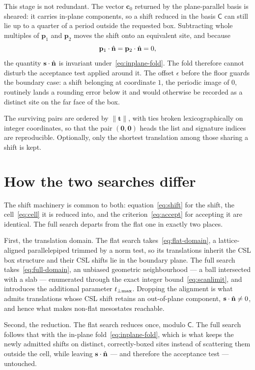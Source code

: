 This stage is not redundant. The vector $\mathbf{c}_0$ returned by the
plane-parallel basis is sheared: it carries in-plane components, so a shift
reduced in the basis $\mathsf{C}$ can still lie up to a quarter of a period
outside the requested box. Subtracting whole multiples of $\mathbf{p}_1$ and
$\mathbf{p}_2$ moves the shift onto an equivalent site, and because
\begin{equation}
  \mathbf{p}_1 \cdot \hat{\mathbf{n}} = \mathbf{p}_2 \cdot \hat{\mathbf{n}} = 0 ,
  \label{eq:inplane-orthogonal}
\end{equation}
the quantity $\mathbf{s} \cdot \hat{\mathbf{n}}$ is invariant under~\eqref{eq:inplane-fold}.
The fold therefore cannot disturb the acceptance test applied around it. The
offset $\epsilon$ before the floor guards the boundary case: a shift belonging at
coordinate $1$, the periodic image of $0$, routinely lands a rounding error
below it and would otherwise be recorded as a distinct site on the far face of
the box.

The surviving pairs are ordered by $\lVert \mathbf{t} \rVert$, with ties broken
lexicographically on integer coordinates, so that the pair
$(\mathbf{0},\mathbf{0})$ heads the list and signature indices are reproducible.
Optionally, only the shortest translation among those sharing a shift is kept.

\section*{How the two searches differ}

The shift machinery is common to both: equation~\eqref{eq:shift} for the shift,
the cell~\eqref{eq:cell} it is reduced into, and the
criterion~\eqref{eq:accept} for accepting it are identical. The full search
departs from the flat one in exactly two places.

First, the translation domain. The flat search
takes~\eqref{eq:flat-domain}, a lattice-aligned parallelepiped trimmed by a
norm test, so its translations inherit the CSL box structure and their CSL
shifts lie in the boundary plane. The full search
takes~\eqref{eq:full-domain}, an unbiased geometric neighbourhood --- a ball
intersected with a slab --- enumerated through the exact integer
bound~\eqref{eq:scanlimit}, and introduces the additional parameter $t_{\perp\max}$.
Dropping the alignment is what admits translations whose CSL shift retains an
out-of-plane component, $\mathbf{s} \cdot \hat{\mathbf{n}} \neq 0$, and hence what makes
non-flat mesostates reachable.

Second, the reduction. The flat search reduces once, modulo
$\mathsf{C}$. The full search follows that with the in-plane
fold~\eqref{eq:inplane-fold}, which is what keeps the newly admitted shifts on
distinct, correctly-boxed sites instead of scattering them outside the cell,
while leaving $\mathbf{s}\cdot\hat{\mathbf{n}}$ --- and therefore the acceptance
test --- untouched.

